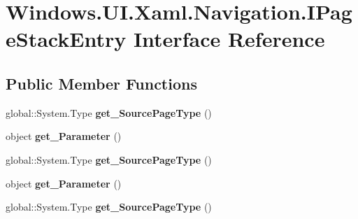 \hypertarget{interface_windows_1_1_u_i_1_1_xaml_1_1_navigation_1_1_i_page_stack_entry}{}\section{Windows.\+U\+I.\+Xaml.\+Navigation.\+I\+Page\+Stack\+Entry Interface Reference}
\label{interface_windows_1_1_u_i_1_1_xaml_1_1_navigation_1_1_i_page_stack_entry}
\subsection*{Public Member Functions}
\begin{DoxyCompactItemize}
\item 
\mbox{\label{interface_windows_1_1_u_i_1_1_xaml_1_1_navigation_1_1_i_page_stack_entry_a76a5c7e17777c4cf382bb0f3a3adaa44}} 
global\+::\+System.\+Type {\bfseries get\+\_\+\+Source\+Page\+Type} ()
\item 
\mbox{\label{interface_windows_1_1_u_i_1_1_xaml_1_1_navigation_1_1_i_page_stack_entry_a4287be3f3110545aaaa19a636c648fd9}} 
object {\bfseries get\+\_\+\+Parameter} ()
\item 
\mbox{\label{interface_windows_1_1_u_i_1_1_xaml_1_1_navigation_1_1_i_page_stack_entry_a76a5c7e17777c4cf382bb0f3a3adaa44}} 
global\+::\+System.\+Type {\bfseries get\+\_\+\+Source\+Page\+Type} ()
\item 
\mbox{\label{interface_windows_1_1_u_i_1_1_xaml_1_1_navigation_1_1_i_page_stack_entry_a4287be3f3110545aaaa19a636c648fd9}} 
object {\bfseries get\+\_\+\+Parameter} ()
\item 
\mbox{\label{interface_windows_1_1_u_i_1_1_xaml_1_1_navigation_1_1_i_page_stack_entry_a76a5c7e17777c4cf382bb0f3a3adaa44}} 
global\+::\+System.\+Type {\bfseries get\+\_\+\+Source\+Page\+Type} ()
\item 

\end{DoxyCompactItemize}

